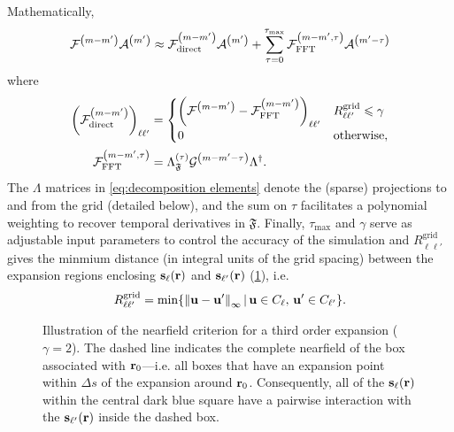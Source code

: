 Mathematically,  
\begin{equation}
  \begin{aligned}
    \mathcal{F}^\qty(m - m')\mathcal{A}^\qty(m') \approx \mathcal{F}^\qty(m-m')_\text{direct} \mathcal{A}^\qty(m') + \sum_{\tau = 0}^{\tau_\text{max}} \mathcal{F}^\qty(m-m', \tau)_\text{FFT} \mathcal{A}^\qty(m' - \tau)
    \end{aligned}
  \label{eq:f decomposition}
\end{equation}
where
\begin{subequations}
  \begin{align}
    \qty(\mathcal{F}^\qty(m-m')_\text{direct})_{\ell\ell'} &= \begin{cases}
      \qty(\mathcal{F}^\qty(m-m') - \mathcal{F}^\qty(m-m')_\text{FFT})_{\ell\ell'} & R^\text{grid}_{\ell\ell'} \leqslant \gamma \\
      0 & \text{otherwise},
    \end{cases} \\
    \mathcal{F}^\qty(m-m', \tau)_\text{FFT} &=  \Lambda_\mathfrak{F}^\qty(\tau) \mathcal{G}^\qty(m - m' - \tau) \Lambda^\dagger.
  \end{align}
  \label{eq:decomposition elements}
\end{subequations}
The $\Lambda$ matrices in \cref{eq:decomposition elements} denote the (sparse) projections to and from the grid (detailed below), and the sum on $\tau$ facilitates a polynomial weighting to recover temporal derivatives in $\mathfrak{F}$.
Finally, $\tau_\text{max}$ and $\gamma$ serve as adjustable input parameters to control the accuracy of the simulation and $R^\text{grid}_{\ell\ell'}$ gives the minmium distance (in integral units of the grid spacing) between the expansion regions enclosing $\vb{s}_\ell(\vb{r})$ and $\vb{s}_{\ell'}(\vb{r})$ (\cref{fig:nearfield criterion}), i.e.
\begin{equation}
  R^\text{grid}_{\ell\ell'} = \min\!\qty{\norm{\vb{u} - \vb{u}'}_\infty \, | \, \vb{u} \in C_\ell, \, \vb{u}' \in C_{\ell'}}.
\end{equation}

\begin{figure}
  \centering
  
  \caption{\label{fig:nearfield criterion}Illustration of the nearfield criterion for a third order expansion ($\gamma = 2$).
    The dashed line indicates the complete nearfield of the box associated with \textcolor{cbblue}{$\vb{r}_0$}---i.e. all boxes that have an expansion point within $\Delta s$ of the expansion around \textcolor{cbblue}{$\vb{r}_0$}.
    Consequently, all of the $\vb{s}_\ell(\vb{r})$ within the central dark blue square have a pairwise interaction with the $\vb{s}_{\ell'}(\vb{r})$ inside the dashed box.
  }
\end{figure}

